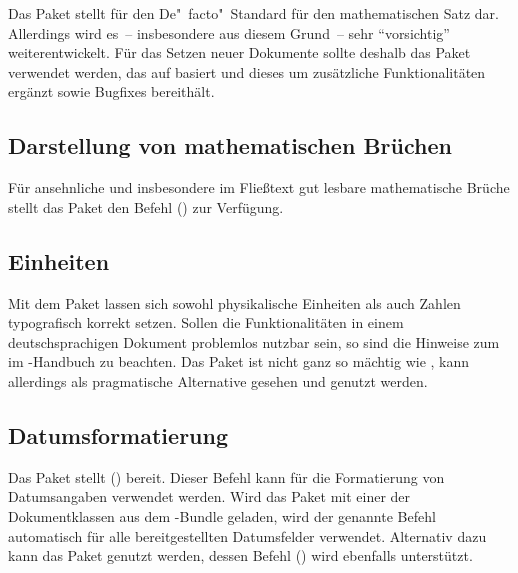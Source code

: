 \documentclass[%
  english,ngerman,%
  cdgeometry=no,DIV=12,%
  cd=false,cdfont=false,cdtitle=true,%
  headings=normal,%
  automark,%
  listof=toc,%
]{tudscrartcl}
\begin{document}
Das Paket  stellt für  den De"~facto"~Standard 
für den mathematischen Satz dar. Allerdings wird es~-- insbesondere aus diesem 
Grund~-- sehr \enquote{vorsichtig} weiterentwickelt. Für das Setzen neuer 
Dokumente sollte deshalb das Paket  verwendet werden, das
auf  basiert und dieses um zusätzliche Funktionalitäten 
ergänzt sowie Bugfixes bereithält.


\subsection{Darstellung von mathematischen Brüchen}
Für ansehnliche und insbesondere im Fließtext gut lesbare mathematische Brüche 
stellt das Paket  den Befehl () zur 
Verfügung.
%
\begin{Preamble}
\usepackage{xfrac}

\end{Preamble}


\subsection{Einheiten}
Mit dem Paket  lassen sich sowohl physikalische Einheiten als 
auch Zahlen typografisch korrekt setzen. Sollen die Funktionalitäten in einem 
deutschsprachigen Dokument problemlos nutzbar sein, so sind die Hinweise zum 
 im 
\TUDScript-Handbuch zu beachten. Das Paket  ist nicht ganz so 
mächtig wie , kann allerdings als pragmatische Alternative 
gesehen und genutzt werden.


\subsection{Datumsformatierung}
Das Paket  stellt () bereit. 
Dieser Befehl kann für die Formatierung von Datumsangaben verwendet werden. 
Wird das Paket mit einer der Dokumentklassen aus dem \TUDScript-Bundle geladen, 
wird der genannte Befehl automatisch für alle bereitgestellten Datumsfelder 
verwendet. Alternativ dazu kann das Paket  genutzt werden, 
dessen Befehl () wird ebenfalls unterstützt.
%
\begin{Preamble}
\usepackage{isodate}

\end{Preamble}
\end{document}
